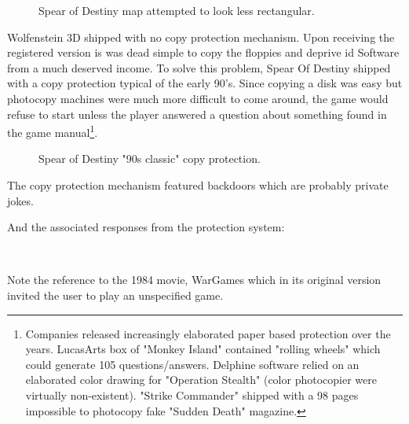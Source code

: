 \documentclass[book.tex]{subfiles}
\begin{document}
   \par
\begin{figure}[H]
\centering
 
 \caption{Spear of Destiny map attempted to look less rectangular.}
 \end{figure}
 \par

Wolfenstein 3D shipped with no copy protection mechanism. Upon receiving the registered version is was dead simple to copy the floppies and deprive id Software from a much deserved income. To solve this problem, Spear Of Destiny shipped with a copy protection typical of the early 90's. Since copying a disk was easy but photocopy machines were much more difficult to come around, the game would refuse to start unless the player answered a question about something found in the game manual\footnote{Companies released increasingly elaborated paper based protection over the years. LucasArts box of "Monkey Island" contained "rolling wheels" which could generate 105 questions/answers. Delphine software relied on an elaborated color drawing for "Operation Stealth" (color photocopier were virtually non-existent). "Strike Commander" shipped with a 98 pages impossible to photocopy fake "Sudden Death" magazine.}.
    
\begin{figure}[H]
\centering
 \caption{Spear of Destiny "90s classic" copy protection.}
 \end{figure}
 \par
 The copy protection mechanism featured backdoors which are probably private jokes.\\
\par
\begin{minipage}{\textwidth}

\end{minipage}
\par
And the associated responses from the protection system:


\begin{minipage}{\textwidth}

\end{minipage}\\
\par
Note the reference to the 1984 movie, WarGames which in its original version invited the user to play an unspecified game.
    \par
\begin{figure}[H]
\centering
 \end{figure}
 \par
\end{document}
